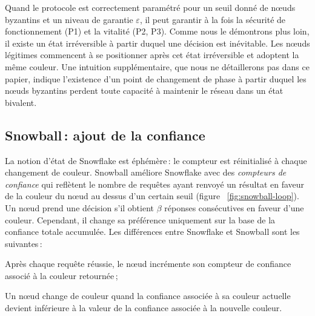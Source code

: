 \documentclass[a4,twocolumn,10pt]{article}
\theoremstyle{definition}
\begin{document}
Quand le protocole est correctement paramétré pour un seuil donné de nœuds byzantins et un niveau de garantie
$\varepsilon$, il peut garantir à la fois la sécurité de fonctionnement (P1) et la vitalité (P2, P3).
Comme nous le démontrons plus loin, il existe un état irréversible à partir duquel une décision est inévitable. Les nœuds
légitimes commencent à se positionner après cet état irréversible et adoptent la même couleur. Une intuition
supplémentaire, que nous ne détaillerons pas dans ce papier, indique l'existence d'un point de changement de phase à
partir duquel les nœuds byzantins perdent toute capacité à maintenir le réseau dans un état bivalent.



\subsection{Snowball\,: ajout de la confiance}

La notion d'état de Snowflake est éphémère\,: le compteur est réinitialisé à chaque changement de couleur.
Snowball améliore Snowflake avec des \emph{compteurs de confiance} qui reflètent le nombre de requêtes ayant renvoyé
un résultat en faveur de la couleur du nœud au dessus d'un certain seuil (figure ~\ref{fig:snowball-loop}).
Un nœud prend une décision s'il obtient $\beta$ réponses consécutives en faveur d'une couleur. Cependant, il change
sa préférence uniquement sur la base de la confiance totale accumulée. Les différences entre Snowflake et Snowball
sont les suivantes\,:

\begin{compactenum}
    \item Après chaque requête réussie, le nœud incrémente son compteur de confiance associé à la couleur retournée\,;
    \item Un nœud change de couleur quand la confiance associée à sa couleur actuelle devient inférieure à la
      valeur de la confiance associée à la nouvelle couleur.
\end{compactenum}
\end{document}
